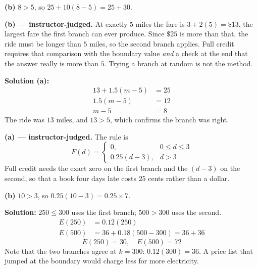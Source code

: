 \documentclass[12pt]{article}
\begin{document}
\textbf{(b)} $8 > 5$, so $25 + 10(8-5) = 25 + 30$. 


\textbf{(b) --- instructor-judged.} At exactly $5$ miles the fare is $3 + 2(5) = \$13$, the largest fare the first branch can ever produce. Since $\$25$ is more than that, the ride must be longer than $5$ miles, so the second branch applies. Full credit requires that comparison with the boundary value \emph{and} a check at the end that the answer really is more than $5$. Trying a branch at random is not the method.

\textbf{Solution (a):}
\begin{align*}
  13 + 1.5(m-5) &= 25 \\
  1.5(m-5) &= 12 \\
  m - 5 &= 8
\end{align*}
The ride was $13$ miles, and $13 > 5$, which confirms the branch was right. 


\textbf{(a) --- instructor-judged.} The rule is
\[ F(d) = \begin{cases} 0, & 0 \le d \le 3 \\ 0.25(d-3), & d > 3 \end{cases} \]
Full credit needs the exact zero on the first branch and the $(d-3)$ on the second, so that a book four days late costs $25$ cents rather than a dollar.

\textbf{(b)} $10 > 3$, so $0.25(10-3) = 0.25 \times 7$. 


\textbf{Solution:} $250 \le 300$ uses the first branch; $500 > 300$ uses the second.
\begin{align*}
  E(250) &= 0.12(250) \\
  E(500) &= 36 + 0.18(500-300) = 36 + 36
\end{align*}
\[ \boxed{E(250) = 30, \quad E(500) = 72} \]
Note that the two branches agree at $k = 300$: $0.12(300) = 36$. A price list that jumped at the boundary would charge less for more electricity.

\end{document}
